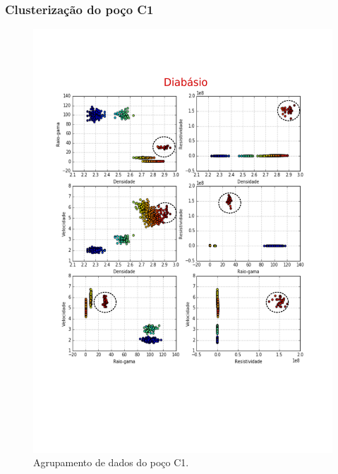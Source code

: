 \documentclass[10pt]{beamer} %
\begin{document}
\begin{frame}
	\frametitle{Clusterização do poço C1}
	\begin{figure}[H]
		\centering
		\includegraphics[scale=0.3]{Imagens/diabasioC1.png}
		\caption{Agrupamento de dados do poço C1.}
	\end{figure} 
\end{frame}
\end{document}
